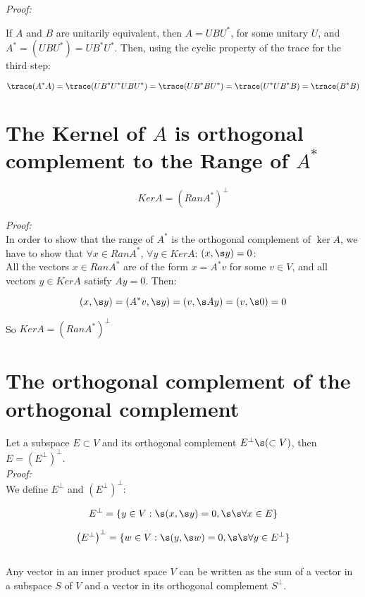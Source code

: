 \textit{Proof:}

If $A$ and $B$ are unitarily equivalent, then $A=UBU^*$, for some unitary $U$, and $A^*=(UBU^*)=UB^*U^*$. Then, using the cyclic property of the trace for the third step:

$$\trace (A^*A)=\trace (UB^*U^*UBU^*)=\trace (UB^*BU^*)=\trace (U^*UB^*B)=\trace (B^*B)$$

\section*{The Kernel of $A$ is orthogonal complement to the Range of $A^*$}\label{sec:kerran} 

$$KerA=(RanA^*)^\perp$$

\textit{Proof:}\\

In order to show that the range of $A^*$ is the orthogonal complement of $\ker A$, we have to show that $\forall x \in Ran A^*$, $\forall y\in Ker A$: $(x,\s y)=0$:\\

All the vectors $x\in Ran A^*$ are of the form $x=A^*v$ for some $v\in V$, and all vectors $y\in Ker A $ satisfy $Ay=0$. Then:

$$(x,\s y)=(A^*v,\s y)=(v,\s Ay)=(v,\s 0)=0$$

So $KerA=(RanA^*)^\perp$


\section*{The orthogonal complement of the orthogonal complement} 

Let a subspace $E\subset V$ and its orthogonal complement $E^\perp\s(\subset V)$, then $E=\left(E^\perp\right)^\perp$.\\

\textit{Proof:}\\

We define $E^\perp$ and $\left(E^\perp\right)^\perp$:

$$E^\perp=\{ y\in V:\s (x,\s y)=0,\s \s \forall x\in E\}$$

$$\left(E^\perp\right)^\perp=\{ w\in V:\s (y,\s w)=0,\s \s \forall y\in E^\perp\}$$\\

Any vector in an inner product space $V$ can be written as the sum of a vector in a subspace $S$ of $V$ and a vector in its orthogonal complement $S^\perp$. \\

